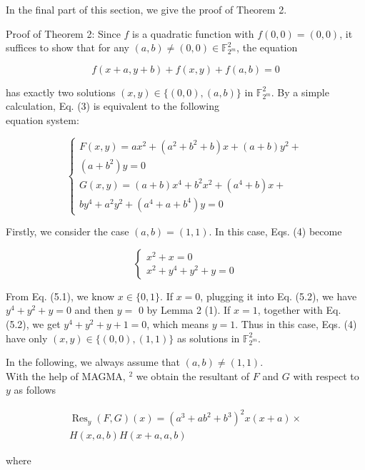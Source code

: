 \documentclass[10pt]{article}
\begin{document}
In the final part of this section, we give the proof of Theorem 2.

Proof of Theorem 2: Since $f$ is a quadratic function with $f(0,0)=(0,0)$, it suffices to show that for any $(a, b) \neq (0,0) \in \mathbb{F}_{2^{m}}^{2}$, the equation


\begin{equation*}
f(x+a, y+b)+f(x, y)+f(a, b)=0 \tag{3}
\end{equation*}


has exactly two solutions $(x, y) \in\{(0,0),(a, b)\}$ in $\mathbb{F}_{2^{m}}^{2}$. By a simple calculation, Eq. (3) is equivalent to the following\\
equation system:

\[
\left\{\begin{array}{l}
F(x, y)=a x^{2}+\left(a^{2}+b^{2}+b\right) x+(a+b) y^{2}+  \tag{4.1}\\
\left(a+b^{2}\right) y=0 \\
G(x, y)=(a+b) x^{4}+b^{2} x^{2}+\left(a^{4}+b\right) x+ \\
b y^{4}+a^{2} y^{2}+\left(a^{4}+a+b^{4}\right) y=0
\end{array}\right.
\]

Firstly, we consider the case $(a, b)=(1,1)$. In this case, Eqs. (4) become

\[
\left\{\begin{array}{l}
x^{2}+x=0  \tag{5.1}\\
x^{2}+y^{4}+y^{2}+y=0
\end{array}\right.
\]

From Eq. (5.1), we know $x \in\{0,1\}$. If $x=0$, plugging it into Eq. (5.2), we have $y^{4}+y^{2}+y=0$ and then $y=$ 0 by Lemma 2 (1). If $x=1$, together with Eq. (5.2), we get $y^{4}+y^{2}+y+1=0$, which means $y=1$. Thus in this case, Eqs. (4) have only $(x, y) \in\{(0,0),(1,1)\}$ as solutions in $\mathbb{F}_{2^{m}}^{2}$.

In the following, we always assume that $(a, b) \neq(1,1)$.\\
With the help of MAGMA, ${ }^{2}$ we obtain the resultant of $F$ and $G$ with respect to $y$ as follows


\begin{gather*}
\operatorname{Res}_{y}(F, G)(x)=\left(a^{3}+a b^{2}+b^{3}\right)^{2} x(x+a) \times \\
H(x, a, b) H(x+a, a, b) \tag{6}
\end{gather*}


where
\end{document}
